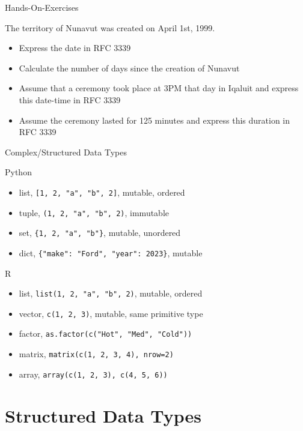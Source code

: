 \documentclass[ignorenonframetext,xcolor=x11names]{beamer}
\begin{document}
\begin{frame}{Hands-On-Exercises}

\begin{tcolorbox}[colback=code]
The territory of Nunavut was created on April 1st, 1999.
\end{tcolorbox}

\begin{itemize}
	\item Express the date in RFC 3339
	\item Calculate the number of days since the creation of Nunavut
	\item Assume that a ceremony took place at 3PM that day in Iqaluit and express this date-time in RFC 3339
	\item Assume the ceremony lasted for 125 minutes and express this duration in RFC 3339
\end{itemize}
\end{frame}

\begin{frame}{Complex/Structured Data Types}
\small
\begin{block}{Python}
	\begin{itemize}
		\item list, \texttt{[1, 2, "a", "b", 2]}, mutable, ordered
		\item tuple, \texttt{(1, 2, "a", "b", 2)}, immutable
		\item set, \texttt{\{1, 2, "a", "b"\}},  mutable, unordered
		\item dict, \texttt{\{"make": "Ford", "year": 2023\}}, mutable
	\end{itemize}
\end{block}
\begin{block}{R}
	\begin{itemize}
		\item list, \texttt{list(1, 2, "a", "b", 2)}, mutable, ordered
		\item vector, \texttt{c(1, 2, 3)}, mutable, same primitive type
		\item factor, \texttt{as.factor(c("Hot", "Med", "Cold"))}
		\item matrix, \texttt{matrix(c(1, 2, 3, 4), nrow=2)}
		\item array, \texttt{array(c(1, 2, 3), c(4, 5, 6))}
	\end{itemize}
\end{block}
\end{frame}

\section{Structured Data Types}
\end{document}
